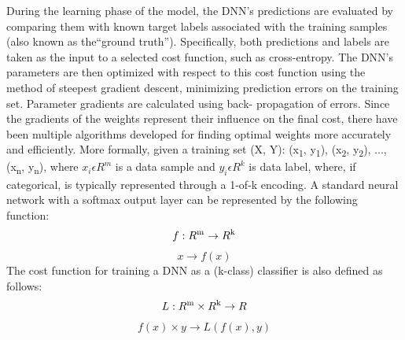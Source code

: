 \documentclass{article}
\begin{document}
	During the learning phase of the model, the DNN’s predictions are evaluated by comparing them with known target labels associated
	with the training samples (also known as the“ground truth”). Specifically, both predictions and labels are taken as the input to a
	selected cost function, such as cross-entropy. The DNN’s parameters are then optimized with respect to this cost function using the
	method of steepest gradient descent, minimizing prediction errors on the training set. Parameter gradients are calculated using back-
	propagation of errors. Since the gradients of the weights represent their influence on the final cost, there have been multiple
	algorithms developed for finding optimal weights more accurately and efficiently.
	More formally, given a training set (X, Y):
	{(x\textsubscript{1}, y\textsubscript{1}), (x\textsubscript{2}, y\textsubscript{2}), ...,(x\textsubscript{n}, y\textsubscript{n})}, where $x_i \epsilon R^m$ is a data sample and $y_i \epsilon R^k$ is data label, where, if categorical, is typically
	represented through a 1-of-k encoding. A standard neural network with a softmax output layer can be represented by the following
	function:
	\begin{equation}
		f : R\textsuperscript{m} \rightarrow R\textsuperscript{k}
	\end{equation}
	\begin{equation*}
		x \rightarrow f(x) 
	\end{equation*}
	The cost function for training a DNN as a (k-class) classifier is also defined as follows:
	\begin{equation}
	L : R\textsuperscript{m} \times R\textsuperscript{k} \rightarrow R
	\end{equation}
	\begin{equation*}
	f(x) \times y \rightarrow L(f(x), y) 
	\end{equation*}
	
\end{document}
